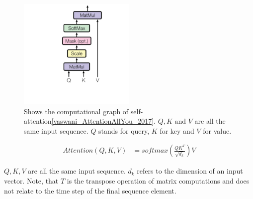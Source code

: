 \documentclass[./../../paper.tex]{subfiles}
\begin{document}
\begin{figure}[htb]
    \centering
    \includegraphics[width=0.5\textwidth]{figures/selfattention.png}
    \caption{Shows the computational graph of self-attention\autoref{vaswani_AttentionAllYou_2017}. $Q, K \text{ and } V$ are all the same input sequence. $Q$ stands for query, $K$ for key and $V$ for value.}
    \label{fig:selfattention}
\end{figure}


\begin{align}
    \label{eq:selfattention}
    Attention(Q, K, V) &= softmax(\frac{QK^T}{\sqrt{d_k}})V 
\end{align}

$Q, K, V$ are all the same input sequence. $d_k$ refers to the dimension of an input vector. Note, that $T$ is the transpose operation of matrix computations and does not relate to the time step of the final sequence element. 
\end{document}
